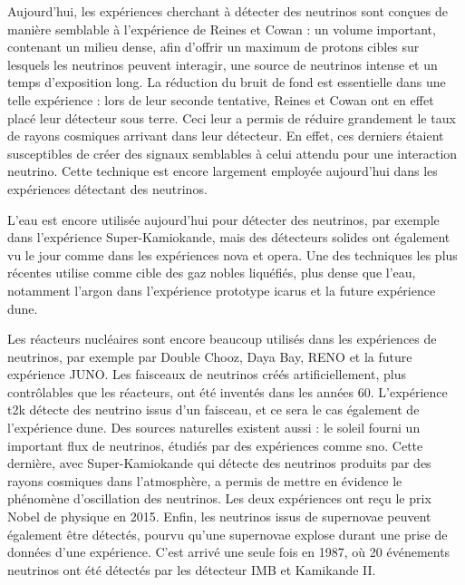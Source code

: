       Aujourd'hui, les expériences cherchant à détecter des neutrinos sont conçues de manière semblable à l'expérience de Reines et Cowan : un volume important, contenant un milieu dense,  afin d'offrir un maximum de protons cibles sur lesquels les neutrinos  peuvent interagir, une source de neutrinos intense et un temps d'exposition long. La réduction du bruit de fond est essentielle dans une telle expérience : lors de leur seconde tentative, Reines et Cowan ont en effet placé leur détecteur sous terre. Ceci leur a permis de réduire grandement le taux de rayons cosmiques arrivant dans leur détecteur. En effet, ces derniers étaient susceptibles de créer des signaux semblables à celui attendu pour une interaction neutrino. Cette technique est encore largement employée aujourd'hui dans les expériences détectant des neutrinos.

      L'eau est encore utilisée aujourd'hui pour détecter des neutrinos, par exemple dans l'expérience Super-Kamiokande\cite{Fukuda1998}, mais des détecteurs solides ont également vu le jour comme dans les expériences \gls{nova}\cite{Adamson2016} et \gls{opera}\cite{Agafonova2018}. Une des techniques les plus récentes utilise comme cible des gaz nobles liquéfiés, plus dense que l'eau, notamment l'argon dans l'expérience prototype \gls{icarus}\cite{Amerio2004} et la future expérience \gls{dune}\cite{Acciarri2016a}. 

      Les réacteurs nucléaires sont encore beaucoup utilisés dans les expériences de neutrinos, par exemple par Double Chooz\cite{Crespo-Anadon2014}, Daya Bay\cite{An2014}, RENO\cite{Collaboration2010} et la future expérience JUNO\cite{An2015}. Les faisceaux de neutrinos créés artificiellement, plus contrôlables que les réacteurs, ont été inventés dans les années 60. L'expérience \gls{t2k}\cite{Abe2018} détecte des neutrino issus d'un faisceau, et ce sera le cas également de l'expérience \gls{dune}\cite{Strait2016}. Des sources naturelles existent aussi : le soleil fourni un important flux de neutrinos, étudiés par des expériences comme \gls{sno}\cite{Aharmim2013}. Cette dernière, avec Super-Kamiokande\cite{Fukuda1998} qui détecte des neutrinos produits par des rayons cosmiques dans l'atmosphère, a permis de mettre en évidence le phénomène d'oscillation des neutrinos. Les deux expériences ont reçu le prix Nobel de physique en 2015. Enfin, les neutrinos issus de supernovae peuvent également être détectés, pourvu qu'une supernovae explose durant une prise de données d'une expérience. C'est arrivé une seule fois en 1987, où 20 événements neutrinos ont été détectés par les détecteur IMB et Kamikande II\cite{Hirata1987}.

